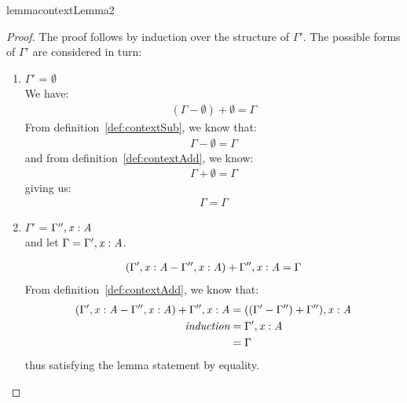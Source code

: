 \begin{restatable}{lemma}{contextLemma2}
  \label{lemma:contextLemma2}
\end{restatable}
\begin{proof}
 The proof follows by induction over the structure of $\Gamma'$. The possible
 forms of $\Gamma'$ are considered in turn:
 \begin{enumerate}
     \item $\Gamma'$ = $\emptyset$\\
     We have:
     \begin{align*}
       (\Gamma - \emptyset) + \emptyset = \Gamma
     \end{align*}
     From definition~\ref{def:contextSub}, we know that:
     \begin{align*}
       \Gamma - \emptyset = \Gamma
     \end{align*}
     and from definition~\ref{def:contextAdd}, we know:
     \begin{align*}
       \Gamma + \emptyset = \Gamma
     \end{align*}
     giving us:
     \begin{align*}
       \Gamma = \Gamma
     \end{align*}


     \item $\Gamma'$ = $\Gamma''  ,   \mathit{x}  :  \mathit{A}$\\
     and let $\Gamma = \Gamma'  ,   \mathit{x}  :  \mathit{A}$.

     \begin{align*}
       (\Gamma'  ,   \mathit{x}  :  \mathit{A} - \Gamma''  ,   \mathit{x}  :  \mathit{A}) + \Gamma''  ,   \mathit{x}  :  \mathit{A} = \Gamma
     \end{align*}
     From definition~\ref{def:contextAdd}, we know that:
     \begin{align*}
       (\Gamma'  ,   \mathit{x}  :  \mathit{A} - \Gamma''  ,   \mathit{x}  :  \mathit{A}) + \Gamma''  ,   \mathit{x}  :  \mathit{A}
       & =  ((\Gamma'  -  \Gamma'') + \Gamma''), \mathit{x}  :  \mathit{A} \\
 \textit{induction}  & = \Gamma'  ,   \mathit{x}  :  \mathit{A} \\
                     & = \Gamma
     \end{align*}
     thus satisfying the lemma statement by equality.


\end{enumerate}
\end{proof}
